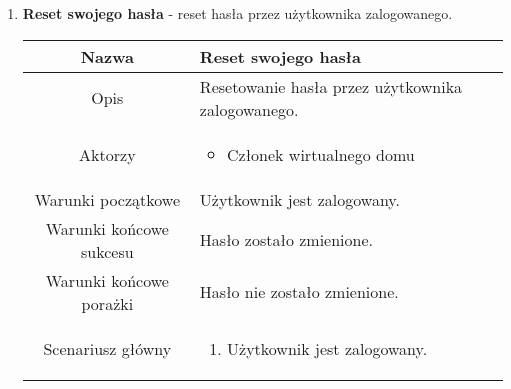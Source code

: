 \documentclass{article}
\begin{document}
\begin{enumerate}
\begin{enumerate}
			\item \textbf{Reset swojego hasła} - reset hasła przez użytkownika
				zalogowanego.
				\begin{table}[H]
					\centering
					\begin{tabular}{|c|p{7cm}|}
						\hline
						Nazwa                   & Reset swojego hasła                                                                                                                                                                                                                                           \\
						\hline
						Opis                    & Resetowanie hasła przez użytkownika zalogowanego.                                                                                                                                                                                                             \\
						\hline
						Aktorzy                 & \begin{itemize}\item Członek wirtualnego domu\end{itemize}                                                                                                                                                                                                    \\
						\hline
						Warunki początkowe      & Użytkownik jest zalogowany.                                                                                                                                                                                                                                   \\
						\hline
						Warunki końcowe sukcesu & Hasło zostało zmienione.                                                                                                                                                                                                                                      \\
						\hline
						Warunki końcowe porażki & Hasło nie zostało zmienione.                                                                                                                                                                                                                                  \\
						\hline
						Scenariusz główny       & \begin{enumerate}\item Użytkownik jest zalogowany.


\end{enumerate}
\end{tabular}
\end{table}
\end{enumerate}
\end{enumerate}
\end{document}
